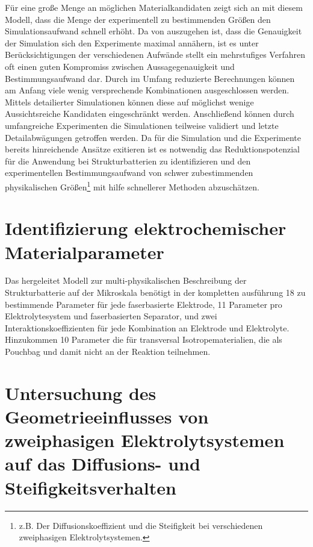 Für eine große Menge an möglichen Materialkandidaten zeigt sich an mit diesem Modell, dass die Menge der experimentell zu bestimmenden Größen den Simulationsaufwand schnell erhöht. Da von auszugehen ist, dass die Genauigkeit der Simulation sich den Experimente maximal annähern, ist es unter Berücksichtigungen der verschiedenen Aufwände stellt ein mehrstufiges Verfahren oft einen guten Kompromiss zwischen Aussagegenauigkeit und Bestimmungsaufwand dar. Durch im Umfang reduzierte Berechnungen können am Anfang viele wenig versprechende Kombinationen ausgeschlossen werden. Mittels detailierter Simulationen können diese auf möglichst wenige Aussichtsreiche Kandidaten eingeschränkt werden. Anschließend können durch umfangreiche Experimenten die Simulationen teilweise validiert und letzte Detailabwägungen getroffen werden. Da für die Simulation und die Experimente bereits hinreichende Ansätze exitieren ist es notwendig das Reduktionspotenzial für die Anwendung bei Strukturbatterien zu identifizieren und den experimentellen Bestimmungsaufwand von schwer zubestimmenden physikalischen Größen\footnote{z.B. Der Diffusionskoeffizient und die Steifigkeit bei verschiedenen zweiphasigen Elektrolytsystemen.} mit hilfe schnellerer Methoden abzuschätzen.


\section{\label{sec:params_elchem}Identifizierung elektrochemischer Materialparameter}

Das hergeleitet Modell zur multi-physikalischen Beschreibung der Strukturbatterie auf der Mikroskala benötigt in der kompletten ausführung 18 zu bestimmende Parameter für jede faserbasierte Elektrode, 11 Parameter pro Elektrolytesystem und faserbasierten Separator, und zwei Interaktionskoeffizienten für jede Kombination an Elektrode und Elektrolyte. Hinzukommen 10 Parameter die für transversal Isotropematerialien, die als Pouchbag und damit nicht an der Reaktion teilnehmen.

\section{\label{sec:sim_sbe}Untersuchung des Geometrieeinflusses von zweiphasigen Elektrolytsystemen auf das Diffusions- und Steifigkeitsverhalten}

